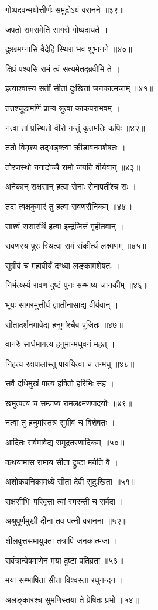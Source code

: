 गोष्पदवन्मयोत्तीर्णः समुद्रोऽयं वरानने ॥३९॥

जपतो रामरामेति सागरो गोष्पदायते ।

दुःखमग्नासि वैदेहि स्थिरा भव शुभानने ॥४०॥

क्षिप्रं पश्यसि रामं त्वं सत्यमेतदब्रवीमि ते ।

इत्याश्वास्य सतीं सीतां दुःखितां जनकात्मजाम् ॥४१॥

ततश्चूडामणिं प्राप्य श्रुत्वा काकपराभवम् ।

नत्वा तां प्रस्थितो वीरो गन्तुं कृतमतिः कपिः ॥४२॥

ततो विमृश्य तद्भड्क्त्वा क्रीडावनमशेषतः ।

तोरणस्थो ननादोच्चै रामो जयति वीर्यवान् ॥४३॥

अनेकान् राक्षसान् हत्वा सेनाः सेनापतींश्च सः ।

तदा त्वक्षकुमारं तु हत्वा रावणसैनिकम् ॥४४॥

साश्वं ससारथिं हत्वा इन्द्रजित्तं गृहीतवान् ।

रावणस्य पुरः स्थित्वा रामं संकीर्त्य लक्ष्मणम् ॥४५॥

सुग्रीवं च महावीर्यं दग्ध्वा लङ्कामशेषतः ।

निर्भर्त्य्स्य रावण दुष्टं पुनः सम्भाष्य जानकीम् ॥४६॥

भूयः सागरमुत्तीर्य ज्ञातीनासाद्य वीर्यवान् ।

सीतादर्शनमावेद्य हनूमांश्चैव पूजितः ॥४७॥

वानरैः सार्धमागत्य हनुमान्मधुवनं महत् ।

निहत्य रक्षपालांस्तु पाययित्वा च तन्मधु ॥४८॥

सर्वे दधिमुखं पात्य हर्षितो हरिभिः सह ।

खमुत्पत्य च सम्प्राप्य रामलक्ष्मणपादयोः ॥४९॥

नत्वा तु हनुमांस्तत्र सुग्रीवं च विशेषतः ।

आदितः सर्वमावेद्य समुद्रतरणादिकम् ॥५०॥

कथयामास रामाय सीता द्रुष्टा मयेति वै ।

अशोकवनिकामध्ये सीता देवी सुदुःखिता ॥५१॥

राक्षसीभिः परिवृत्ता त्वां स्मरन्ती च सर्वदा ।

अश्रुपूर्णमुखी दीना तव पत्नी वरानना ॥५२॥

शीलवृत्तसमायुक्ता तत्रापि जनकात्मजा ।

सर्वत्रान्वेषमाणेन मया दुष्टा पतिव्रता ॥५३॥

मया सम्भाषिता सीता विश्वस्ता रघुनन्दन ।

अलङ्कारश्च सुमणिस्तया ते प्रेषितः प्रभो ॥५४॥

